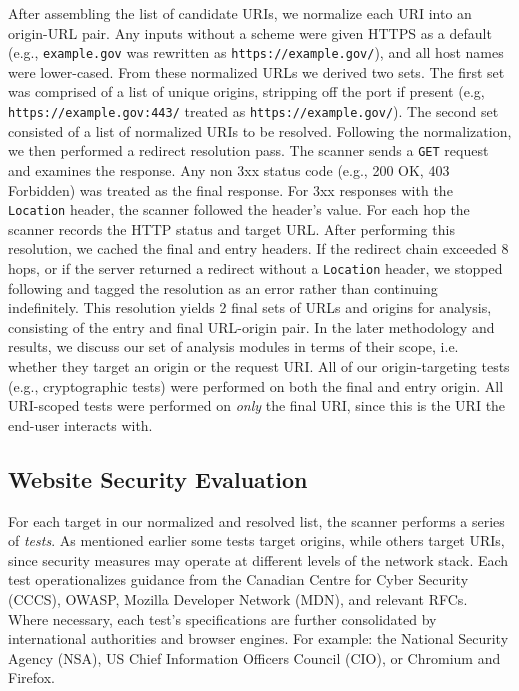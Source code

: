 \documentclass[pdflatex,sn-mathphys-num]{sn-jnl}
\numberwithin{equation}{section}
\theoremstyle{thmstyleone}
\theoremstyle{thmstyletwo}%
\theoremstyle{thmstylethree}%
\begin{document}
After assembling the list of candidate URIs, we normalize each URI into an origin-URL pair. Any inputs 
without a scheme were given HTTPS as a default (e.g., \texttt{example.gov} was rewritten as
\texttt{https://example.gov/}), and all host names were lower-cased. From these normalized URLs we derived two sets. The first set was comprised of a list of 
unique origins, stripping off the port if present (e.g, \texttt{https://example.gov:443/} treated as \texttt{https://example.gov/}). 
The second set consisted of a list of 
normalized URIs to be resolved. Following the normalization, we then performed a redirect resolution pass.
The scanner sends a \texttt{GET} request and examines the response.
Any non 3xx status code (e.g., 200 OK, 403 Forbidden) was treated as the final response. For 3xx responses with
the \texttt{Location} header, the scanner followed the header's value. For
each hop the scanner records the HTTP status and target URL. After performing this resolution, we 
cached the final and
entry headers. If the redirect chain exceeded 8 hops, 
or if the server returned a redirect without a \texttt{Location} header, we stopped following and tagged the resolution as
an error rather than continuing indefinitely. This resolution 
yields 2 final sets of URLs and origins for analysis, consisting of the entry and final URL-origin pair. In the later methodology and results, we
discuss our set of analysis modules in terms of their scope, 
i.e. whether they target an origin or the request URI. All of our origin-targeting tests (e.g., cryptographic tests) 
were performed on both the final and entry origin. 
All URI-scoped tests were performed on \emph{only} the final URI, since this is the URI the end-user interacts with. 

\subsection{Website Security Evaluation}

For each target in our normalized and resolved list, the scanner performs a series of \emph{tests}. 
As mentioned earlier some tests target origins, while others target URIs, since security measures may operate at
different levels of the network stack. Each test operationalizes guidance from the Canadian Centre for 
Cyber Security (CCCS), OWASP, Mozilla Developer Network (MDN), and relevant RFCs. Where necessary, each test's specifications are further
consolidated by international authorities and browser engines. For example: the National Security Agency (NSA), 
US Chief Information Officers Council (CIO), or Chromium and Firefox.
\end{document}
